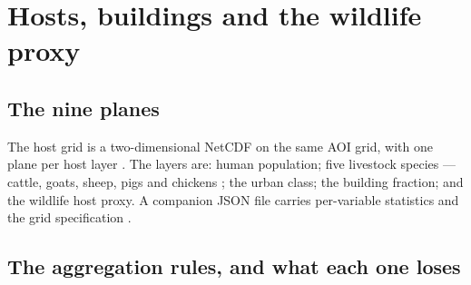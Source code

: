 \documentclass[11pt,a4paper]{article} \usepackage[utf8]{inputenc} \usepackage{lmodern} \usepackage[T1]{fontenc}
\begin{document}
\section{Hosts, buildings and the wildlife proxy} \label{sec:hosts}

\subsection{The nine planes}

The host grid is a two-dimensional NetCDF on the same AOI grid, with one plane per host layer
. The layers are: human population; five
livestock species --- cattle, goats, sheep, pigs and chickens
; the urban class; the building fraction; and the
wildlife host proxy. A companion JSON file carries per-variable statistics and the grid
specification .

\subsection{The aggregation rules, and what each one loses}
\end{document}
